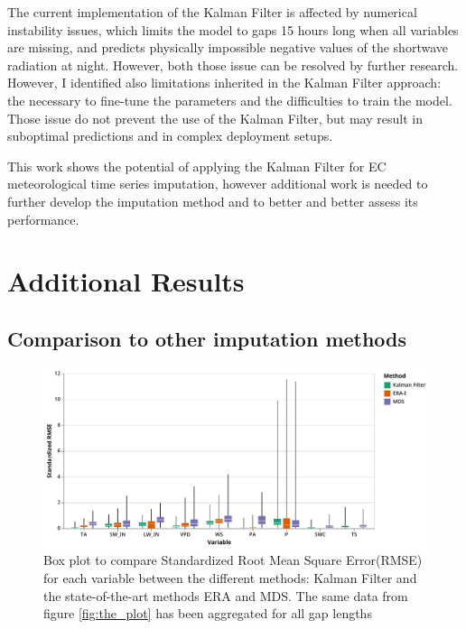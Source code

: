 \documentclass{article}
\newcommand{\imgwidth}{6in}
\let\Oldsection\section
\renewcommand{\section}{\FloatBarrier\Oldsection}
\let\Oldsubsection\subsection
\renewcommand{\subsection}{\FloatBarrier\Oldsubsection}
\begin{document}
The current implementation of the Kalman Filter is affected by numerical instability issues, which limits the model to gaps 15 hours long when all variables are missing, and predicts physically impossible negative values of the shortwave radiation at night. However, both those issue can be resolved by further research. However, I identified also limitations inherited in the Kalman Filter approach: the necessary to fine-tune the parameters and the difficulties to train the model. Those issue do not prevent the use of the Kalman Filter, but may result in suboptimal predictions and in complex deployment setups.

This work shows the potential of applying the Kalman Filter for EC meteorological time series imputation, however additional work is needed to further develop the imputation method and to better and better assess its performance. 


\pagebreak

\printbibliography

\appendix

\renewcommand\thefigure{\thesection.\arabic{figure}} 
\renewcommand\thetable{\thesection.\arabic{table}} 
\renewcommand\theequation{\thesection.\arabic{equation}} 

\FloatBarrier

\section{Additional Results}

\setcounter{figure}{0} 
\setcounter{table}{0} 

\subsection{Comparison to other imputation methods}

\begin{figure}
    \centerline{\includegraphics[width=\imgwidth]{the_plot_stand}}
\caption{Box plot to compare Standardized Root Mean Square Error(RMSE) for each variable between the different methods: Kalman Filter and the state-of-the-art methods ERA and MDS. The same data from figure \ref{fig:the_plot} has been aggregated for all gap lengths}
\label{fig:the_plot_stand}
\end{figure}
\end{document}

